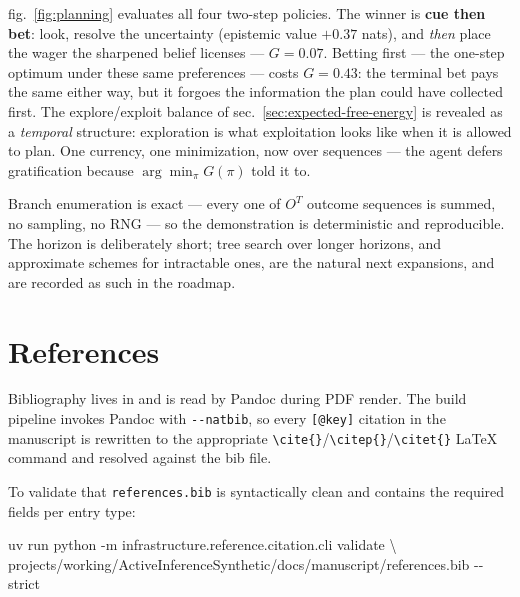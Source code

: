 \documentclass[
  english,
]{article}
\newenvironment{Shaded}{}{}
\newcommand{\AttributeTok}[1]{\textcolor[rgb]{0.49,0.56,0.16}{#1}}
\newcommand{\DataTypeTok}[1]{\textcolor[rgb]{0.56,0.13,0.00}{#1}}
\newcommand{\ExtensionTok}[1]{#1}
\newcommand{\NormalTok}[1]{#1}
\begin{document}
fig.~\ref{fig:planning} evaluates all four two-step policies. The winner
is \textbf{cue then bet}: look, resolve the uncertainty (epistemic value
\(+0.37\) nats), and \emph{then} place the wager the sharpened belief
licenses --- \(G = 0.07\). Betting first --- the one-step optimum under
these same preferences --- costs \(G = 0.43\): the terminal bet pays the
same either way, but it forgoes the information the plan could have
collected first. The explore/exploit balance of
sec.~\ref{sec:expected-free-energy} is revealed as a \emph{temporal}
structure: exploration is what exploitation looks like when it is
allowed to plan. One currency, one minimization, now over sequences ---
the agent defers gratification because \(\arg\min_\pi G(\pi)\) told it
to.

Branch enumeration is exact --- every one of \(O^T\) outcome sequences
is summed, no sampling, no RNG --- so the demonstration is deterministic
and reproducible. The horizon is deliberately short; tree search over
longer horizons, and approximate schemes for intractable ones, are the
natural next expansions, and are recorded as such in the roadmap.

\newpage

\section{References}\label{sec:references}

Bibliography lives in
\href{references.bib}{} and is
read by Pandoc during PDF render. The build pipeline invokes Pandoc with
\texttt{-\/-natbib}, so every \texttt{{[}@key{]}} citation in the
manuscript is rewritten to the appropriate
\texttt{\textbackslash{}cite\{\}}/\texttt{\textbackslash{}citep\{\}}/\texttt{\textbackslash{}citet\{\}}
LaTeX command and resolved against the bib file.

To validate that \texttt{references.bib} is syntactically clean and
contains the required fields per entry type:

\begin{Shaded}
\begin{Highlighting}[]
\ExtensionTok{uv}\NormalTok{ run python }\AttributeTok{{-}m}\NormalTok{ infrastructure.reference.citation.cli validate }\DataTypeTok{\textbackslash{}}
\NormalTok{    projects/working/ActiveInferenceSynthetic/docs/manuscript/references.bib }\AttributeTok{{-}{-}strict}
\end{Highlighting}
\end{Shaded}




\providecommand{\bibsection}{}
\renewcommand{\bibsection}{}


\end{document}
